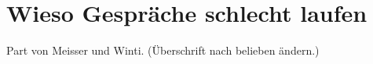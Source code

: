 \section*{Wieso Gespräche schlecht laufen}

Part von Meisser und Winti. (Überschrift nach belieben ändern.)